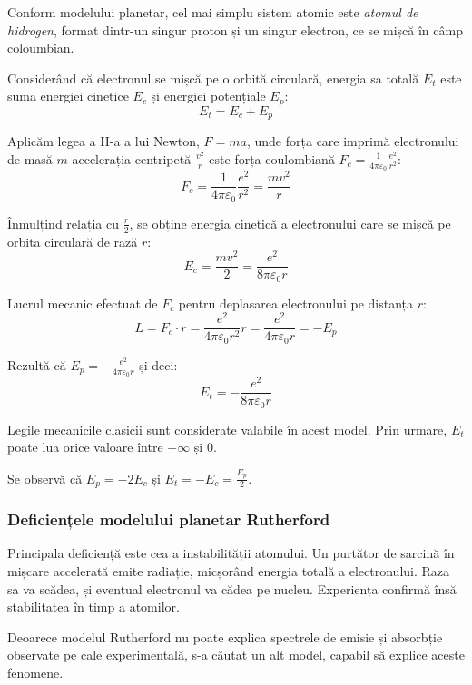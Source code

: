 Conform modelului planetar, cel mai simplu sistem atomic este
\emph{atomul de hidrogen}, format dintr-un singur proton și un singur electron,
ce se mișcă în câmp coloumbian.

Considerând că electronul se mișcă pe o orbită circulară, energia sa totală
$E_t$ este suma energiei cinetice $E_c$ și energiei potențiale $E_p$:
\[ E_t = E_c + E_p \]

Aplicăm legea a II-a a lui Newton, \( F = ma \), unde forța care imprimă
electronului de masă $m$ accelerația centripetă \( \frac{v^2}{r} \) este forța
coulombiană \( F_c = \frac{1}{4\pi\varepsilon_0} \frac{e^2}{r^2} \):
\[ F_c = \frac{1}{4\pi\varepsilon_0} \frac{e^2}{r^2} = \frac{mv^2}{r} \]

Înmulțind relația cu \( \frac{r}{2} \), se obține energia cinetică a
electronului care se mișcă pe orbita circulară de rază $r$:
\[ E_c = \frac{mv^2}{2} = \frac{e^2}{8\pi\varepsilon_0 r} \]

Lucrul mecanic efectuat de $F_c$ pentru deplasarea electronului pe distanța
$r$:
\[
    L = F_c \cdot r = \frac{e^2}{4\pi\varepsilon_0 r^2} r
    = \frac{e^2}{4\pi\varepsilon_0 r} = - E_p
\]

Rezultă că \( E_p = - \frac{e^2}{4\pi\varepsilon_0 r} \) și deci:
\[ E_t = - \frac{e^2}{8\pi\varepsilon_0 r} \]

Legile mecanicile clasicii sunt considerate valabile în acest model. Prin urmare, $E_t$ poate lua orice valoare între $-\infty$ și 0.

Se observă că \( E_p = -2E_c \) și \( E_t = -E_c = \frac{E_p}{2} \).

\subsubsection*{Deficiențele modelului planetar Rutherford}

Principala deficiență este cea a instabilității atomului. Un purtător de sarcină în
mișcare accelerată emite radiație, micșorând energia totală a electronului.
Raza sa va scădea, și eventual electronul va cădea pe nucleu. Experiența
confirmă însă stabilitatea în timp a atomilor.

Deoarece modelul Rutherford nu poate explica spectrele de emisie și absorbție
observate pe cale experimentală, s-a căutat un alt model, capabil să explice
aceste fenomene.
